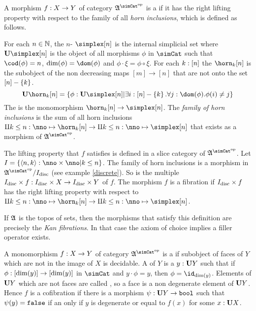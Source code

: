 \documentclass[csh.tex]{subfiles}
\begin{document}
\begin{definition} A morphism $f: X\to Y$ of category $\ambient\s$ is a  if it has the right lifting property with respect to the family of all \emph{horn inclusions}, which is defined as follows. 

For each $n\in\mathbb N$, the $n$- $\simplex[n]$ is the internal simplicial set where $\base{\simplex[n]}$ is the object of all morphisms $\phi$ in $\simCat$ such that $\cod(\phi) = n$, $\dim(\phi) = \dom(\phi)$ and $\phi\cdot \xi = \phi\circ \xi$. For each $k:[n]$ the  $\horn_k[n]$ is the subobject of the non decreasing maps $[m]\to [n]$ that are not onto the set $[n]-\left\{k\right\}$.
\[ \base{\horn_k[n]} = \set{\phi\of\base{\simplex[n]}| \exists i\of[n]-\set k.\forall j\of \dom(\phi).\phi(i)\neq j } \]
The  is the monomorphism $\horn_k[n]\to\simplex[n]$. The \emph{family of horn inclusions} is the sum of all horn inclusions $\coproduct{k\leq n\of\nno}{\horn_k[n]}\to \coproduct{k\leq n\of\nno}{\simplex[n]}$ that exists as a morphism of $\ambient\s$.

The lifting property that $f$ satisfies is defined in a slice category of $\ambient\s$. Let $I = \set{\tuplet{n,k}\of\nno\times\nno|k\leq n}$. The family of horn inclusions is a morphism in $\ambient\s/I\disc$ (see example \ref{discrete}). So is the multiple $I_{\rm disc}\times f: I_{\rm disc}\times X\to I_{\rm disc}\times Y$ of $f$. The morphism $f$ is a fibration if $I_{\rm disc}\times f$ has the right lifting property with respect to $\coproduct{k\leq n\of\nno}{\horn_k[n]}\to \coproduct{k\leq n\of\nno}{\simplex[n]}$.
\end{definition}

\begin{example} If $\mathfrak A$ is the topos of sets, then the morphisms that satisfy this definition are precisely the \emph{Kan fibrations}. In that case the axiom of choice implies a filler operator exists. \end{example}

\begin{definition} A monomorphism $f: X\to Y$ of category $\ambient\s$ is a  if subobject of faces of $Y$ which are not in the image of $X$ is decidable. A  of $Y$ is a $y:\mathbf{U} Y$ such that if $\phi: [\dim(y)]\to [\dim(y)]$ in $\simCat$ and $y\cdot \phi = y$, then $\phi = \id_{\dim(y)}$. Elements of $\mathbf{U} Y$ which are not faces are called , so a face is a non degenerate element of $\mathbf{U} Y$. Hence $f$ is a cofibration if there is a morphism $\psi:\mathbf{U} Y\to\mathtt{bool}$ such that $\psi(y)=\mathtt{false}$ if an only if $y$ is degenerate or equal to $f(x)$ for some $x: \mathbf{U} X$.\end{definition}
\end{document}
